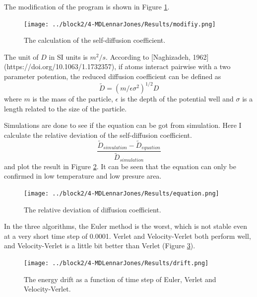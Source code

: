 \documentclass{assignmeownt}
\begin{document}
The modification of the program is shown in Figure \ref{fig:diffusion}.

\begin{figure}
    \centering
    \texttt{[image: ../block2/4-MDLennarJones/Results/modifiy.png]}
    \caption{The calculation of the self-diffusion coefficient.}
    \label{fig:diffusion}
\end{figure}

The unit of $D$ in SI units is $m^2/s$. According to [Naghizadeh, 1962](https://doi.org/10.1063/1.1732357), if atoms interact pairwise with a two parameter potention, the reduced diffusion coefficient can be defined as
$$\tilde{D}=(m/\epsilon\sigma^2)^{1/2}D$$
where $m$ is the mass of the particle, $\epsilon$ is the depth of the potential well and $\sigma$ is a length related to the size of the particle.


Simulations are done to see if the equation can be got from simulation. Here I calculate the relative deviation of the self-diffusion coefficient.
$$
\frac{\tilde{D}_{simulation}-\tilde{D}_{equation}}{\tilde{D}_{simulation}}
$$
and plot the result in Figure \ref{fig:devi}. It can be seen that the equation can only be confirmed in low temperature and low presure area.

\begin{figure}
    \centering
    \texttt{[image: ../block2/4-MDLennarJones/Results/equation.png]}
    \caption{The relative deviation of diffusion coefficient.}
    \label{fig:devi}
\end{figure}

In the three algorithms, the Euler method is the worst, which is not stable even at a very short time step of 0.0001. Verlet and Velocity-Verlet both perform well, and Velocity-Verlet is a little bit better than Verlet (Figure \ref{fig:drift}).

\begin{figure}
    \centering
    \texttt{[image: ../block2/4-MDLennarJones/Results/drift.png]}
    \caption{The energy drift as a function of time step of Euler, Verlet and Velocity-Verlet.}
    \label{fig:drift}
\end{figure}
\end{document}
